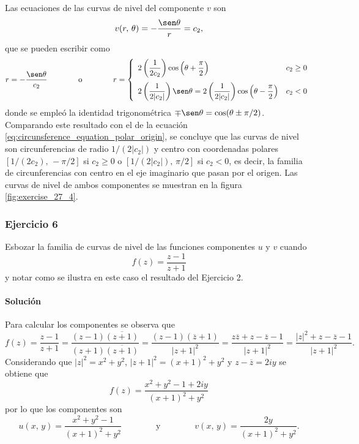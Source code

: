 \documentclass[a4paper]{report}
\begin{document}
Las ecuaciones de las curvas de nivel del componente \(v\) son
\[
 v(r,\,\theta)=-\frac{\sen\theta}{r}=c_2,
\]
que se pueden escribir como
\[
 r=-\frac{\sen\theta}{c_2}
 \qquad\qquad\textrm{o}\qquad\qquad
 r=\left\{ 
 \begin{array}{ll}
  2\left(\dfrac{1}{2c_2}\right)\cos\left(\theta+\dfrac{\pi}{2}\right) & c_2\geq0\\[\bigskipamount]
  2\left(\dfrac{1}{2|c_2|}\right)\sen\theta=2\left(\dfrac{1}{2|c_2|}\right)\cos\left(\theta-\dfrac{\pi}{2}\right) & c_2<0
 \end{array}
 \right.
\]
donde se empleó la identidad trigonométrica \(\mp\sen\theta=\cos(\theta\pm\pi/2)\). Comparando este resultado con el de la ecuación \ref{eq:circunsference_equation_polar_origin}, se concluye que las curvas de nivel son circunferencias de radio \(1/(2|c_2|)\) y centro con coordenadas polares \([1/(2c_2),\,-\pi/2]\) si \(c_2\geq0\) o \([1/(2|c_2|),\,\pi/2]\) si \(c_2<0\), es decir, la familia de circunferencias con centro en el eje imaginario que pasan por el origen. Las curvas de nivel de ambos componentes se muestran en la figura \ref{fig:exercise_27_4}.

\subsubsection{Ejercicio 6}

Esbozar la familia de curvas de nivel de las funciones componentes \(u\) y \(v\) cuando 
\[
 f(z)=\frac{z-1}{z+1}
\]
y notar como se ilustra en este caso el resultado del Ejercicio 2.

\paragraph{Solución} Para calcular los componentes se observa que 
\[
 f(z)=\frac{z-1}{z+1}=\frac{(z-1)\overline{(z+1)}}{(z+1)\overline{(z+1)}}
  =\frac{(z-1)(\overline{z}+1)}{|z+1|^2}
  =\frac{z\overline{z}+z-\overline{z}-1}{|z+1|^2}
  =\frac{|z|^2+z-\overline{z}-1}{|z+1|^2}.
\]
Considerando que \(|z|^2=x^2+y^2\), \(|z+1|^2=(x+1)^2+y^2\) y \(z-\overline{z}=2iy\) se obtiene que 
\[
 f(z)=\frac{x^2+y^2-1+2iy}{(x+1)^2+y^2}
\]
por lo que los componentes son
\[
 u(x,\,y)=\frac{x^2+y^2-1}{(x+1)^2+y^2}
 \qquad\qquad\textrm{y}\qquad\qquad
 v(x,\,y)=\frac{2y}{(x+1)^2+y^2}.
\]
\end{document}
